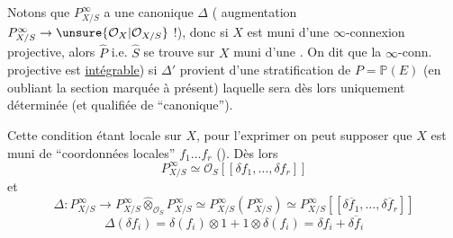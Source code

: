 Notons que  $P^\infty_{X/S}$ a une    canonique $\Delta$ ( augmentation $P^\infty_{X/S}\to\unsure{\mathcal{O}_X|\mathcal{O}_{X/S}}$ !), donc si $X$ est muni d'une $\infty$-connexion projective, alors  $\widehat P$ i.e. $\widehat S$ se trouve sur $X$ muni d'une    . On dit que la $\infty$-conn. projective est  \uline{intégrable}) si $\Delta'$ provient d'une  stratification de $P=\mathbb{P}(E)$ (en oubliant  la section marquée à présent) laquelle sera dès lors uniquement déterminée (et qualifiée de ``canonique'').

Cette condition étant locale sur $X$, pour l'exprimer on peut supposer que $X$ est muni de ``coordonnées locales'' $f_1\ldots f_r$ (). Dès lors
\[
P^\infty_{X/S}\simeq\mathcal{O}_S[[\delta f_1,\ldots,\delta f_r]]
\]
et
\[
\Delta:P^\infty_{X/S}\longrightarrow P^\infty_{X/S}\widehat\otimes_{\mathcal{O}_S}P^\infty_{X/S}
\simeq P^\infty_{X/S}(P^\infty_{X/S})\simeq P^\infty_{X/S}[[\overline{\delta f_1},\ldots,\overline{\delta f_r}]]
\]
\[
\Delta(\delta f_i)=\delta(f_i)\otimes1+1\otimes\delta(f_i)=\delta f_i+\overline{\delta f_i}
\]

